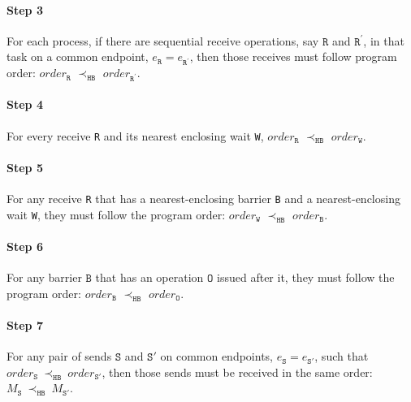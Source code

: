 \paragraph*{Step 3} For each process, if there are sequential receive
operations, say $\mathtt{R}$ and $\mathtt{R^\prime}$, in that task
on a common endpoint, $e_\mathtt{R} = e_\mathtt{R^\prime}$, then those
receives must follow program order: $\mathit{order}_\mathtt{R}$
$\prec_\mathtt{HB}$ $\mathit{order}_\mathtt{R^\prime}$.

\paragraph*{Step 4} For every receive \texttt{R} and its nearest
enclosing wait \texttt{W}, $\mathit{order}_\mathtt{R}$
$\prec_\mathtt{HB}$ $\mathit{order}_\mathtt{W}$.

\paragraph*{Step 5} For any receive \texttt{R} that has a nearest-enclosing barrier \texttt{B} and a nearest-enclosing wait \texttt{W}, they must follow the program order:
$\mathit{order}_\mathtt{W}$ $\prec_\mathtt{HB}$ $\mathit{order}_\mathtt{B}$.

\paragraph*{Step 6} For any barrier $\mathtt{B}$ that has an operation $\mathtt{O}$ issued after it, they must follow the program order: $\mathit{order}_\mathtt{B}$
$\prec_\mathtt{HB}$ $\mathit{order}_\mathtt{O}$.

\paragraph*{Step 7} For any pair of sends $\mathtt{S}$ and
$\mathtt{S'}$ on common endpoints, $e_{\mathtt{S}}=e_{\mathtt{S'}}$,
such that
$\mathit{order}_\mathtt{S}\ \mathrm{\prec_\mathtt{HB}}\ \mathit{order}_\mathtt{S'}$,
then those sends must be received in the same order:
$M_{\mathtt{S}}\ \mathrm{\prec_{\mathtt{HB}}}\ M_{\mathtt{S'}}$.








